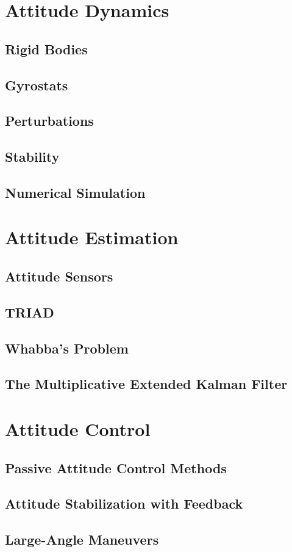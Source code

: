 \documentclass[11pt,letterpaper]{report}
\begin{document}
\chapter{Attitude Dynamics}

\section{Rigid Bodies}

\section{Gyrostats}

\section{Perturbations}

\section{Stability}

\section{Numerical Simulation}

\chapter{Attitude Estimation}

\section{Attitude Sensors}

\section{TRIAD}

\section{Whabba's Problem}

\section{The Multiplicative Extended Kalman Filter}

\chapter{Attitude Control}

\section{Passive Attitude Control Methods}

\section{Attitude Stabilization with Feedback}

\section{Large-Angle Maneuvers}
\end{document}
